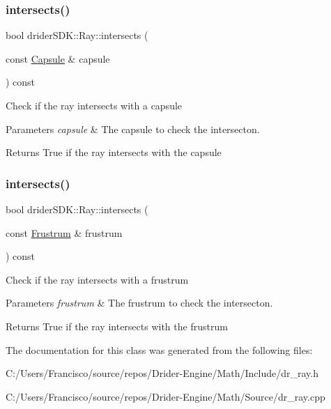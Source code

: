 \subsubsection{\texorpdfstring{intersects()}{intersects()}\hspace{0.1cm}{\footnotesize\ttfamily [5/6]}}
{\footnotesize\ttfamily bool drider\+S\+D\+K\+::\+Ray\+::intersects (\begin{DoxyParamCaption}\item[{const \hyperlink{classdrider_s_d_k_1_1_capsule}{Capsule} \&}]{capsule }\end{DoxyParamCaption}) const}

Check if the ray intersects with a capsule


\begin{DoxyParams}{Parameters}
{\em capsule} & The capsule to check the intersecton.\\
\hline
\end{DoxyParams}
\begin{DoxyReturn}{Returns}
True if the ray intersects with the capsule 
\end{DoxyReturn}
\mbox{\label{classdrider_s_d_k_1_1_ray_a9c83c1a5befaa12d3f65fe0c7cc45a7b}} 
\subsubsection{\texorpdfstring{intersects()}{intersects()}\hspace{0.1cm}{\footnotesize\ttfamily [6/6]}}
{\footnotesize\ttfamily bool drider\+S\+D\+K\+::\+Ray\+::intersects (\begin{DoxyParamCaption}\item[{const \hyperlink{classdrider_s_d_k_1_1_frustrum}{Frustrum} \&}]{frustrum }\end{DoxyParamCaption}) const}

Check if the ray intersects with a frustrum


\begin{DoxyParams}{Parameters}
{\em frustrum} & The frustrum to check the intersecton.\\
\hline
\end{DoxyParams}
\begin{DoxyReturn}{Returns}
True if the ray intersects with the frustrum 
\end{DoxyReturn}


The documentation for this class was generated from the following files\+:\begin{DoxyCompactItemize}
\item 
C\+:/\+Users/\+Francisco/source/repos/\+Drider-\/\+Engine/\+Math/\+Include/dr\+\_\+ray.\+h\item 
C\+:/\+Users/\+Francisco/source/repos/\+Drider-\/\+Engine/\+Math/\+Source/dr\+\_\+ray.\+cpp\end{DoxyCompactItemize}
